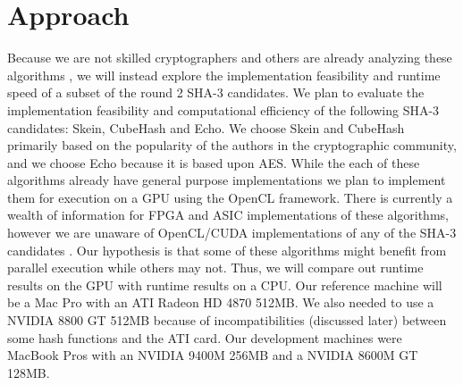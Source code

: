 \section*{Approach}
Because we are not skilled cryptographers and others are already analyzing these algorithms \cite{Sha3Zoo}, we will instead explore the implementation feasibility and runtime speed of a subset of the round 2 SHA-3 candidates.
We plan to evaluate the implementation feasibility and computational efficiency of the following SHA-3 candidates: Skein, CubeHash and Echo.
We choose Skein and CubeHash primarily based on the popularity of the authors in the cryptographic community, and we choose Echo because it is based upon AES.
While the each of these algorithms already have general purpose implementations we plan to implement them for execution on a GPU using the OpenCL framework.
There is currently a wealth of information for FPGA and ASIC implementations of these algorithms, however we are unaware of OpenCL/CUDA implementations of any of the SHA-3 candidates \cite{Sha3Hardware}.
Our hypothesis is that some of these algorithms might benefit from parallel execution while others may not.
Thus, we will compare out runtime results on the GPU with runtime results on a CPU.
Our reference machine will be a Mac Pro with an ATI Radeon HD 4870 512MB. 
We also needed to use a NVIDIA 8800 GT 512MB because of incompatibilities (discussed later) between some hash functions and the ATI card.  
Our development machines were MacBook Pros with an NVIDIA 9400M 256MB and a NVIDIA 8600M GT 128MB.